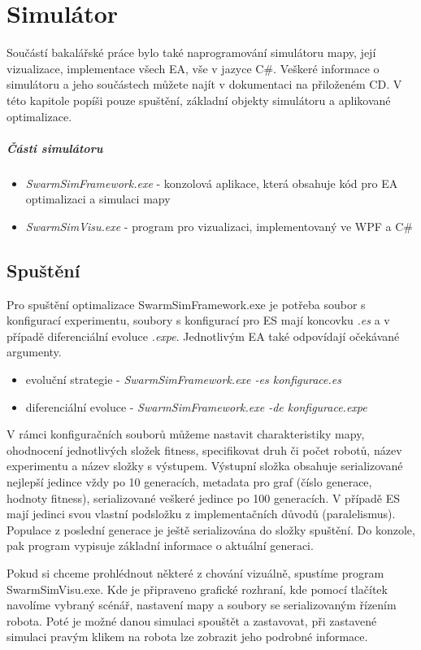 
\chapter{Simulátor}
Součástí bakalářské práce bylo také naprogramování simulátoru mapy, její vizualizace, implementace všech EA, vše v jazyce C\#. Veškeré informace o simulátoru a jeho součástech můžete najít v dokumentaci na přiloženém CD. V této kapitole popíši pouze spuštění, základní objekty simulátoru a aplikované optimalizace. \par 
\paragraph{Části simulátoru}
\begin{itemize}
	\item \textit{SwarmSimFramework.exe} - konzolová aplikace, která obsahuje kód pro EA optimalizaci a simulaci mapy
	\item \textit{SwarmSimVisu.exe} - program pro vizualizaci, implementovaný ve WPF a C\# 
\end{itemize}

\section*{Spuštění}
Pro spuštění optimalizace SwarmSimFramework.exe je potřeba soubor s konfigurací experimentu, soubory s konfigurací pro ES mají koncovku \textit{.es} a v případě diferenciální evoluce \textit{.expe}. Jednotlivým EA také odpovídají očekávané argumenty. 
\begin{itemize}
	\item evoluční strategie - \textit{SwarmSimFramework.exe -es konfigurace.es}  
	\item diferenciální evoluce - \textit{SwarmSimFramework.exe -de konfigurace.expe} 
\end{itemize}
\par 
V rámci konfiguračních souborů můžeme nastavit charakteristiky mapy, ohodnocení jednotlivých složek fitness, specifikovat druh či počet robotů, název experimentu a název složky s výstupem. Výstupní složka obsahuje serializované nejlepší jedince vždy po 10 generacích, metadata pro graf (číslo generace, hodnoty fitness), serializované veškeré jedince po 100 generacích. V případě ES mají jedinci svou vlastní podsložku z implementačních důvodů (paralelismus). Populace z poslední generace je ještě serializována do složky spuštění. Do konzole, pak program vypisuje základní informace o aktuální generaci.
\par 
Pokud si chceme prohlédnout některé z chování vizuálně, spustíme program SwarmSimVisu.exe. Kde je připraveno grafické rozhraní, kde pomocí tlačítek navolíme vybraný scénář, nastavení mapy a soubory se serializovaným řízením robota. Poté je možné danou simulaci spouštět a zastavovat, při zastavené simulaci pravým klikem na robota lze zobrazit jeho podrobné informace.
\clearpage
